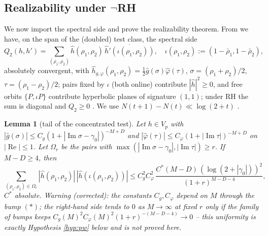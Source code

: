 \documentclass[11pt,reqno]{amsart}
\newtheorem{lemma}[theorem]{Lemma}
\theoremstyle{definition}
\newcommand{\half}{\tfrac12}
\begin{document}
\subsection{Realizability under \texorpdfstring{$\neg$}{not-}RH}
We now import the spectral side and prove the realizability theorem. From
\cite{P40,P35} we have, on the span of the (doubled) test class, the spectral
side
\begin{equation}\label{eq:speca}
Q_2(h,h')=\sum_{(\rho_1,\rho_2)}\hat h(\rho_1,\rho_2)\,
\overline{\hat h'(\iota(\rho_1,\rho_2))},\quad
\iota(\rho_1,\rho_2):=(1-\bar\rho_1,1-\bar\rho_2),
\end{equation}
absolutely convergent, with \(\hat h_{g,\varphi}(\rho_1,\rho_2)=
\half\hat g(\sigma)\hat\varphi(\tau)\), \(\sigma=(\rho_1+\rho_2)/2\),
\(\tau=(\rho_1-\rho_2)/2\); pairs fixed by \(\iota\) (both online) contribute
\(|\hat h|^2\geq0\), and free orbits \(\{P,\iota P\}\) contribute hyperbolic
planes of signature \((1,1)\); under RH the sum is diagonal and \(Q_2\geq0\)
\cite{P40,P35}. We use \(N(t+1)-N(t)\ll\log(2+t)\) \cite[Thm.\
5.8]{IwaniecKowalski}.

\begin{lemma}[tail of the concentrated test]\label{lem:tail}
Let \(h\in V_p\) with \(|\hat g(\sigma)|\leq C_g(1+|\operatorname{Im}\sigma-
\gamma_0|)^{-M+D}\) and \(|\hat\varphi(\tau)|\leq C_\varphi(1+|\operatorname{Im}
\tau|)^{-M+D}\) on \(|\operatorname{Re}|\leq1\). Let \(\Omega_r\) be the pairs
with \(\max(|\operatorname{Im}\sigma-\gamma_0|,|\operatorname{Im}\tau|)\geq r\).
If \(M-D\geq4\), then
\[
\sum_{(\rho_1,\rho_2)\in\Omega_r}|\hat h(\rho_1,\rho_2)|\,
|\hat h(\iota(\rho_1,\rho_2))|\leq
C_g^2C_\varphi^2\,\frac{C^*(M-D)\,(\log(2+|\gamma_0|))^2}{(1+r)^{M-D-4}},
\]
\(C^*\) absolute. \emph{Warning (corrected): the constants
\(C_g,C_\varphi\) depend on \(M\) through the bump \((\ast)\); the right-hand
side tends to \(0\) as \(M\to\infty\) at fixed \(r\) only if the family of
bumps keeps \(C_g(M)^2C_\varphi(M)^2(1+r)^{-(M-D-4)}\to0\) -- this uniformity is
exactly Hypothesis \ref{hyp:pw} below and is \emph{not} proved here.}
\end{lemma}
\end{document}
